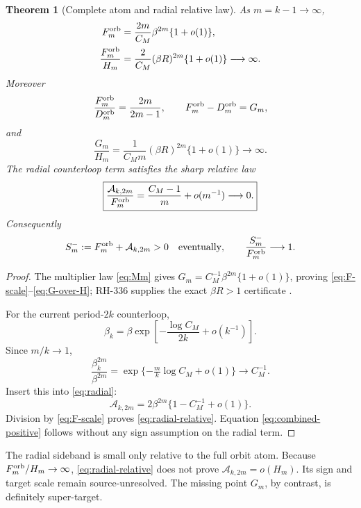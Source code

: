 \documentclass[11pt]{article}
\newtheorem{theorem}{Theorem}[section]
\theoremstyle{remark}
\newcommand{\cA}{\mathcal A}
\begin{document}
\begin{theorem}[Complete atom and radial relative law]
\label{thm:scales}
As $m=k-1\to\infty$,
\begin{align}
 F_m^{\rm orb}
 &=\frac{2m}{C_M}\beta^{2m}\{1+o(1)\},
 \label{eq:F-scale}\\
 \frac{F_m^{\rm orb}}{H_m}
 &=\frac2{C_M}(\beta R)^{2m}\{1+o(1)\}
 \longrightarrow\infty.
 \label{eq:F-over-H}
\end{align}
Moreover
\begin{equation}\label{eq:partial-full}
 \frac{F_m^{\rm orb}}{D_m^{\rm orb}}=\frac{2m}{2m-1},
 \qquad
 F_m^{\rm orb}-D_m^{\rm orb}=G_m,
\end{equation}
and
\begin{equation}\label{eq:G-over-H}
 \frac{G_m}{H_m}
 =\frac1{C_Mm}(\beta R)^{2m}\{1+o(1)\}
 \longrightarrow\infty.
\end{equation}
The radial counterloop term satisfies the sharp relative law
\begin{equation}\label{eq:radial-relative}
 \boxed{
 \frac{\cA_{k,2m}}{F_m^{\rm orb}}
 =\frac{C_M-1}{m}+o(m^{-1})\longrightarrow0.}
\end{equation}
Consequently
\begin{equation}\label{eq:combined-positive}
 S_m^-:=F_m^{\rm orb}+\cA_{k,2m}>0
 \quad\hbox{eventually},
 \qquad
 \frac{S_m^-}{F_m^{\rm orb}}\longrightarrow1.
\end{equation}
\end{theorem}

\begin{proof}
The multiplier law \eqref{eq:Mm} gives
$G_m=C_M^{-1}\beta^{2m}\{1+o(1)\}$, proving
\eqref{eq:F-scale}--\eqref{eq:G-over-H}; RH-336 supplies the exact
$\beta R>1$ certificate \citep{WangProjectorMass2026}.

For the current period-$2k$ counterloop,
\begin{equation}\label{eq:beta-k-asymptotic}
 \beta_k=\beta\exp\left[-\frac{\log C_M}{2k}+o(k^{-1})\right].
\end{equation}
Since $m/k\to1$,
\[
 \frac{\beta_k^{2m}}{\beta^{2m}}
 =\exp\{-\tfrac{m}{k}\log C_M+o(1)\}
 \longrightarrow C_M^{-1}.
\]
Insert this into \eqref{eq:radial}:
\[
 \cA_{k,2m}
 =2\beta^{2m}\{1-C_M^{-1}+o(1)\}.
\]
Division by \eqref{eq:F-scale} proves
\eqref{eq:radial-relative}.  Equation \eqref{eq:combined-positive} follows
without any sign assumption on the radial term.
\end{proof}

The radial sideband is small only relative to the full orbit atom.  Because
$F_m^{\rm orb}/H_m\to\infty$, \eqref{eq:radial-relative} does not prove
$\cA_{k,2m}=o(H_m)$.  Its sign and target scale remain source-unresolved.
The missing point $G_m$, by contrast, is definitely super-target.
\end{document}
